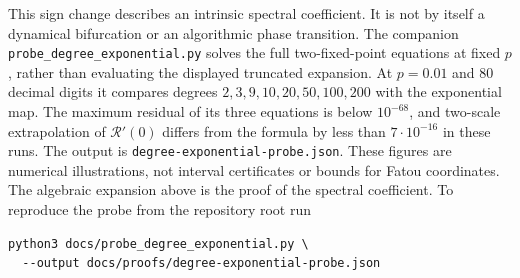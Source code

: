 \documentclass[11pt]{article}
\begin{document}
This sign change describes an intrinsic spectral coefficient. It is
not by itself a dynamical bifurcation or an algorithmic phase transition.
The companion \texttt{probe\_degree\_exponential.py} solves the full
two-fixed-point equations at fixed $p$, rather than evaluating the
displayed truncated expansion. At $p=0.01$ and 80 decimal digits it
compares degrees $2,3,9,10,20,50,100,200$ with the exponential map.
The maximum residual of its three equations is below $10^{-68}$,
and two-scale extrapolation of $\mathcal R'(0)$ differs from the
formula by less than $7\cdot10^{-16}$ in these runs. The output is
\texttt{degree-exponential-probe.json}. These figures are numerical
illustrations, not interval certificates or bounds for Fatou coordinates.
The algebraic expansion above is the proof of the spectral coefficient.
To reproduce the probe from the repository root run
\begin{verbatim}
python3 docs/probe_degree_exponential.py \
  --output docs/proofs/degree-exponential-probe.json
\end{verbatim}
\end{document}
